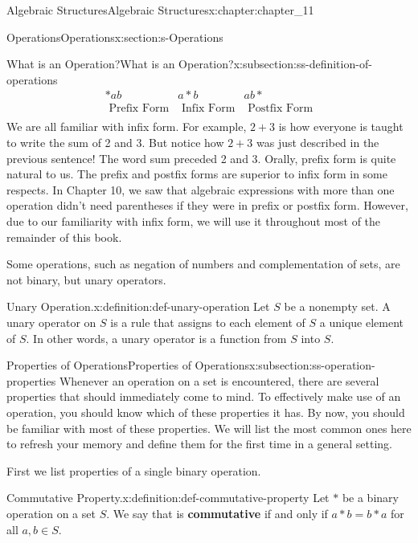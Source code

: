\documentclass[twoside,10pt,]{book}
\newcommand{\terminology}[1]{\textbf{#1}}
\numberwithin{equation}{section}
\begin{document}
\begin{chapterptx}{Algebraic Structures}{}{Algebraic Structures}{}{}{x:chapter:chapter_11}
\begin{sectionptx}{Operations}{}{Operations}{}{}{x:section:s-Operations}
\begin{subsectionptx}{What is an Operation?}{}{What is an Operation?}{}{}{x:subsection:ss-definition-of-operations}
\begin{equation*}
\begin{array}{ccc}
*a b & a*b & a b * \\
\textrm{ Prefix Form} & \textrm{ Infix Form} & \textrm{ Postfix Form} \\
\end{array}
\end{equation*}
We are all familiar with infix form. For example, \(2 + 3\) is how everyone is taught to write the sum of 2 and 3. But notice how \(2 + 3\) was just described in the previous sentence! The word sum preceded 2 and 3. Orally, prefix form is quite natural to us. The prefix and postfix forms are superior to infix form in some respects. In Chapter 10, we saw that algebraic expressions with more than one operation didn't need parentheses if they were in prefix or postfix form. However, due to our familiarity with infix form, we will use it throughout most of the remainder of this book.%
\par
Some operations, such as negation of numbers and complementation of sets, are not binary, but unary operators.%
\begin{definition}{Unary Operation.}{x:definition:def-unary-operation}%
%
Let  \(S\) be a nonempty set. A unary operator on \(S\) is a rule that assigns to each element of \(S\) a unique element of \(S\). In other words, a unary operator is a function from \(S\) into \(S\).%
\end{definition}
\end{subsectionptx}
%
%
\typeout{************************************************}
\typeout{************************************************}
%
\begin{subsectionptx}{Properties of Operations}{}{Properties of Operations}{}{}{x:subsection:ss-operation-properties}
%
Whenever an operation on a set is encountered, there are several properties that should immediately come to mind. To effectively make use of an operation, you should know which of these properties it has. By now, you should be familiar with most of these properties. We will list the most common ones here to refresh your memory and define them for the first time in a general setting.%
\par
First we list properties of a single binary operation.%
\begin{definition}{Commutative Property.}{x:definition:def-commutative-property}%
%
Let \(*\) be a binary operation on a set \(S\). We say that \textasteriskcentered{} is \terminology{commutative} if and only if \(a * b = b * a\)  for all \(a, b \in  S\).%

\end{definition}
\end{subsectionptx}
\end{sectionptx}
\end{chapterptx}
\end{document}
